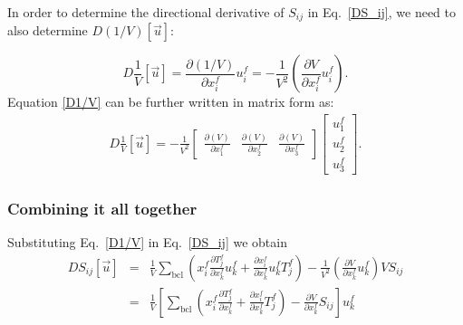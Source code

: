 In order to determine the directional derivative of $S_{ij}$ in Eq.\ \eqref{DS_ij}, we need to also determine $D \left(1/V\right) [\vec{u}]$:
%

\begin{equation}
D \frac{1}{V}[\vec{u}] = \frac{\partial (1/V)}{\partial x_i^f} u_i^f = -\frac{1}{V^2} \left( \frac{\partial V}{\partial x_i^f} u_i^f\right).
\label{D1/V}
\end{equation}
%
Equation \eqref{D1/V} can be further written in matrix form as:
%
\begin{eqnarray}
D\frac{1}{V}[\vec{u}] = -\frac{1}{V^2}
\begin{bmatrix}
\frac{\partial (V)}{\partial x_1^f} & \frac{\partial (V)}{\partial x_2^f} & \frac{\partial(V)}{\partial x_3^f}
\end{bmatrix}
%
\begin{bmatrix}
u_1^f \\ u_2^f \\ u_3^f
\end{bmatrix}.
\label{D1/V_matrix}
\end{eqnarray}
%

\subsubsection{Combining it all together}

Substituting Eq.\ \eqref{D1/V} in Eq.\ \eqref{DS_ij} we obtain
%
\begin{eqnarray}
DS_{ij}[\vec{u}] &=&  \frac{1}{V} \sum_{\text{bcl}} \left(x_i^f \frac{\partial T_j^f}{\partial x_k^f} u_k^f + \frac{\partial x_i^f}{\partial x_k^f}u_k^f T_j^f \right) -\frac{1}{V^2} \left( \frac{\partial V}{\partial x_k^f} u_k^f\right) V S_{ij} \nonumber\\
%
&=&  \frac{1}{V} \left[ \sum_{\text{bcl}} \left(x_i^f \frac{\partial T_j^f}{\partial x_k^f} + \frac{\partial x_i^f}{\partial x_k^f} T_j^f \right) -  \frac{\partial V}{\partial x_k^f} S_{ij} \right] u_k^f
\end{eqnarray}
%
